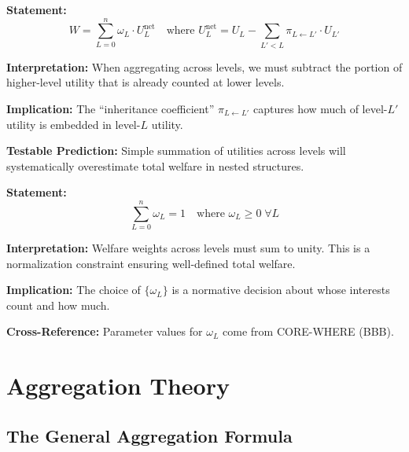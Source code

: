 \begin{tcolorbox}[colback=gray!5!white, colframe=gray!75!black,
    title=Axiom SRL-7: No Double-Counting]
\textbf{Statement:}
\begin{equation}
W = \sum_{L=0}^{n} \omega_L \cdot U_L^{\text{net}} \quad \text{where } U_L^{\text{net}} = U_L - \sum_{L' < L} \pi_{L \leftarrow L'} \cdot U_{L'}
\end{equation}

\textbf{Interpretation:} When aggregating across levels, we must subtract the portion of
higher-level utility that is already counted at lower levels.

\textbf{Implication:} The ``inheritance coefficient'' $\pi_{L \leftarrow L'}$ captures how much
of level-$L'$ utility is embedded in level-$L$ utility.

\textbf{Testable Prediction:} Simple summation of utilities across levels will systematically
overestimate total welfare in nested structures.
\end{tcolorbox}

\begin{tcolorbox}[colback=gray!5!white, colframe=gray!75!black,
    title=Axiom SRL-8: Weight Normalization]
\textbf{Statement:}
\begin{equation}
\sum_{L=0}^{n} \omega_L = 1 \quad \text{where } \omega_L \geq 0 \; \forall L
\end{equation}

\textbf{Interpretation:} Welfare weights across levels must sum to unity.
This is a normalization constraint ensuring well-defined total welfare.

\textbf{Implication:} The choice of $\{\omega_L\}$ is a normative decision about whose
interests count and how much.

\textbf{Cross-Reference:} Parameter values for $\omega_L$ come from CORE-WHERE (BBB).
\end{tcolorbox}


\section{Aggregation Theory}
\label{sec:who-aggregation}

\subsection{The General Aggregation Formula}

